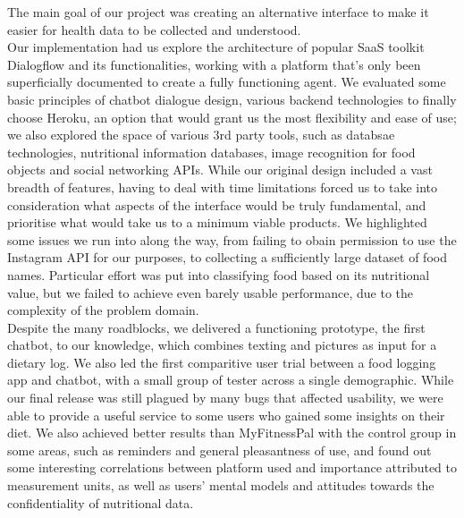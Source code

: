 The main goal of our project was creating an alternative interface to make it easier for health data to be collected and understood. \\
Our implementation had us explore the architecture of popular SaaS toolkit Dialogflow and its functionalities, working with a platform that's only been superficially documented to create a fully functioning agent. We evaluated some basic principles of chatbot dialogue design, various backend technologies to finally choose Heroku, an option that would grant us the most flexibility and ease of use; we also explored the space of various 3rd party tools, such as databsae technologies, nutritional information databases, image recognition for food objects and social networking APIs. While our original design included a vast breadth of features, having to deal with time limitations forced us to take into consideration what aspects of the interface would be truly fundamental, and prioritise what would take us to a minimum viable products. We highlighted some issues we run into along the way, from failing to obain permission to use the Instagram API for our purposes, to collecting a sufficiently large dataset of food names. Particular effort was put into classifying food based on its nutritional value, but we failed to achieve even barely usable performance, due to the complexity of the problem domain.\\
Despite the many roadblocks, we delivered a functioning prototype, the first chatbot, to our knowledge, which combines texting and pictures as input for a dietary log. We also led the first comparitive user trial between a food logging app and chatbot, with a small group of tester across a single demographic. While our final release was still plagued by many bugs that affected usability, we were able to provide a useful service to some users who gained some insights on their diet. We also achieved better results than MyFitnessPal with the control group in some areas, such as reminders and general pleasantness of use, and found out some interesting correlations between platform used and importance attributed to measurement units, as well as users' mental models and attitudes towards the confidentiality of nutritional data. \\
